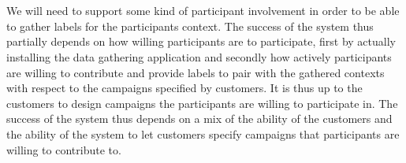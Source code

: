 \\\\
We will need to support some kind of participant involvement in order to be able to gather labels for the participants context. The success of the system thus partially depends on how willing participants are to participate, first by actually installing the data gathering application and secondly how actively participants are willing to contribute and provide labels to pair with the gathered contexts with respect to the campaigns specified by customers. It is thus up to the customers to design campaigns the participants are willing to participate in. The success of the system thus depends on a mix of the ability of the customers and the ability of the system to let customers specify campaigns that participants are willing to contribute to.
